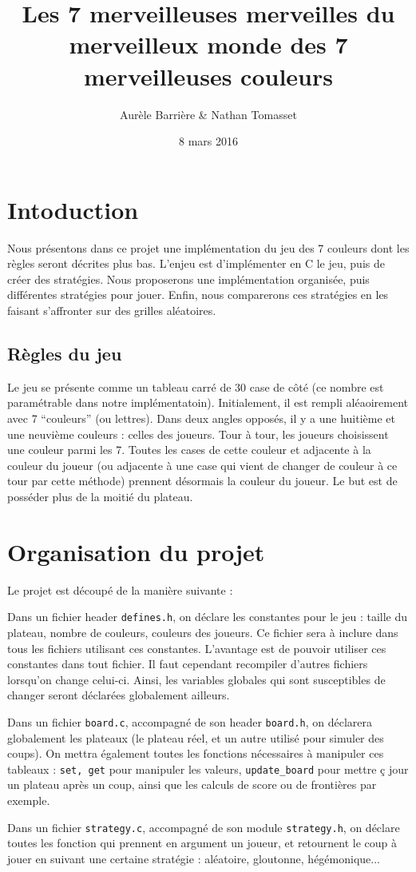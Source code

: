 \documentclass[12pt]{article}
\title{Les 7 merveilleuses merveilles du merveilleux monde des 7 merveilleuses couleurs}
\author{Aurèle Barrière \& Nathan Tomasset}
\date{8 mars 2016}
\def\question#1{\subsection{#1}}
\def\sec#1{\section{#1}}
\begin{document}
\maketitle
\tableofcontents
\newpage

\sec{Intoduction}
Nous présentons dans ce projet une implémentation du jeu des 7 couleurs dont les règles seront décrites plus bas. L'enjeu est d'implémenter en C le jeu, puis de créer des stratégies.
Nous proposerons une implémentation organisée, puis différentes stratégies pour jouer. Enfin, nous comparerons ces stratégies en les faisant s'affronter sur des grilles aléatoires.


\question{Règles du jeu}
Le jeu se présente comme un tableau carré de 30 case de côté (ce nombre est paramétrable dans notre implémentatoin). Initialement, il est rempli aléaoirement avec 7 ``couleurs'' (ou lettres). Dans deux angles opposés, il y a une huitième et une neuvième couleurs : celles des joueurs. Tour à tour, les joueurs choisissent une couleur parmi les 7. Toutes les cases de cette couleur et adjacente à la couleur du joueur (ou adjacente à une case qui vient de changer de couleur à ce tour par cette méthode) prennent désormais la couleur du joueur. Le but est de posséder plus de la moitié du plateau.

\sec{Organisation du projet}
Le projet est découpé de la manière suivante :

Dans un fichier header \texttt{defines.h}, on déclare les constantes pour le jeu : taille du plateau, nombre de couleurs, couleurs des joueurs. Ce fichier sera à inclure dans tous les fichiers utilisant ces constantes.
L'avantage est de pouvoir utiliser ces constantes dans tout fichier. Il faut cependant recompiler d'autres fichiers lorsqu'on change celui-ci. Ainsi, les variables globales qui sont susceptibles de changer seront déclarées globalement ailleurs.

Dans un fichier \texttt{board.c}, accompagné de son header \texttt{board.h}, on déclarera globalement les plateaux (le plateau réel, et un autre utilisé pour simuler des coups). On mettra également toutes les fonctions nécessaires à manipuler ces tableaux : \texttt{set, get} pour manipuler les valeurs, \texttt{update\_board} pour mettre ç jour un plateau après un coup, ainsi que les calculs de score ou de frontières par exemple.

Dans un fichier \texttt{strategy.c}, accompagné de son module \texttt{strategy.h}, on déclare toutes les fonction qui prennent en argument un joueur, et retournent le coup à jouer en suivant une certaine stratégie : aléatoire, gloutonne, hégémonique...
\end{document}
